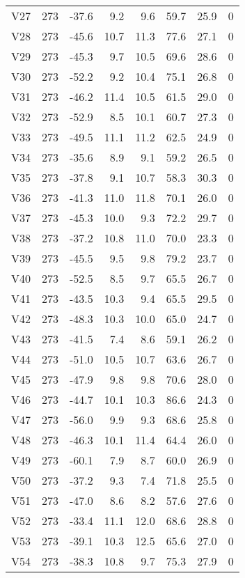 {\begin{longtable}{lrrrrrrr}
  V27 & 273 & -37.6 &  9.2 &  9.6 & 59.7 & 25.9 & 0 \\ 
  V28 & 273 & -45.6 & 10.7 & 11.3 & 77.6 & 27.1 & 0 \\ 
  V29 & 273 & -45.3 &  9.7 & 10.5 & 69.6 & 28.6 & 0 \\ 
  V30 & 273 & -52.2 &  9.2 & 10.4 & 75.1 & 26.8 & 0 \\ 
  V31 & 273 & -46.2 & 11.4 & 10.5 & 61.5 & 29.0 & 0 \\ 
  V32 & 273 & -52.9 &  8.5 & 10.1 & 60.7 & 27.3 & 0 \\ 
  V33 & 273 & -49.5 & 11.1 & 11.2 & 62.5 & 24.9 & 0 \\ 
  V34 & 273 & -35.6 &  8.9 &  9.1 & 59.2 & 26.5 & 0 \\ 
  V35 & 273 & -37.8 &  9.1 & 10.7 & 58.3 & 30.3 & 0 \\ 
  V36 & 273 & -41.3 & 11.0 & 11.8 & 70.1 & 26.0 & 0 \\ 
  V37 & 273 & -45.3 & 10.0 &  9.3 & 72.2 & 29.7 & 0 \\ 
  V38 & 273 & -37.2 & 10.8 & 11.0 & 70.0 & 23.3 & 0 \\ 
  V39 & 273 & -45.5 &  9.5 &  9.8 & 79.2 & 23.7 & 0 \\ 
  V40 & 273 & -52.5 &  8.5 &  9.7 & 65.5 & 26.7 & 0 \\ 
  V41 & 273 & -43.5 & 10.3 &  9.4 & 65.5 & 29.5 & 0 \\ 
  V42 & 273 & -48.3 & 10.3 & 10.0 & 65.0 & 24.7 & 0 \\ 
  V43 & 273 & -41.5 &  7.4 &  8.6 & 59.1 & 26.2 & 0 \\ 
  V44 & 273 & -51.0 & 10.5 & 10.7 & 63.6 & 26.7 & 0 \\ 
  V45 & 273 & -47.9 &  9.8 &  9.8 & 70.6 & 28.0 & 0 \\ 
  V46 & 273 & -44.7 & 10.1 & 10.3 & 86.6 & 24.3 & 0 \\ 
  V47 & 273 & -56.0 &  9.9 &  9.3 & 68.6 & 25.8 & 0 \\ 
  V48 & 273 & -46.3 & 10.1 & 11.4 & 64.4 & 26.0 & 0 \\ 
  V49 & 273 & -60.1 &  7.9 &  8.7 & 60.0 & 26.9 & 0 \\ 
  V50 & 273 & -37.2 &  9.3 &  7.4 & 71.8 & 25.5 & 0 \\ 
  V51 & 273 & -47.0 &  8.6 &  8.2 & 57.6 & 27.6 & 0 \\ 
  V52 & 273 & -33.4 & 11.1 & 12.0 & 68.6 & 28.8 & 0 \\ 
  V53 & 273 & -39.1 & 10.3 & 12.5 & 65.6 & 27.0 & 0 \\ 
  V54 & 273 & -38.3 & 10.8 &  9.7 & 75.3 & 27.9 & 0 \\ 

\end{longtable}}
